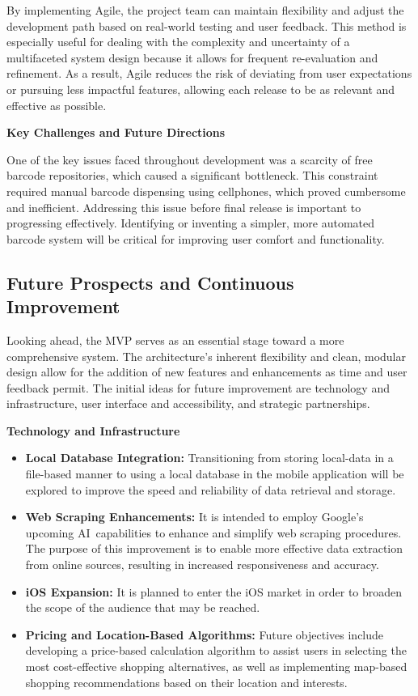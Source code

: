 \pagebreak

By implementing Agile, the project team can maintain flexibility and adjust the development path based on real-world testing and user feedback. This method is especially useful for dealing with the complexity and uncertainty of a multifaceted system design because it allows for frequent re-evaluation and refinement. As a result, Agile reduces the risk of deviating from user expectations or pursuing less impactful features, allowing each release to be as relevant and effective as possible. \cite{agile}

\noindent\textbf{Key Challenges and Future Directions}

One of the key issues faced throughout development was a scarcity of free barcode repositories, which caused a significant bottleneck. This constraint required manual barcode dispensing using cellphones, which proved cumbersome and inefficient. Addressing this issue before final release is important to progressing effectively. Identifying or inventing a simpler, more automated barcode system will be critical for improving user comfort and functionality.

\subsection{Future Prospects and Continuous Improvement}

Looking ahead, the MVP serves as an essential stage toward a more comprehensive system. The architecture's inherent flexibility and clean, modular design allow for the addition of new features and enhancements as time and user feedback permit. The initial ideas for future improvement are technology and infrastructure, user interface and accessibility, and strategic partnerships.

\noindent\textbf{Technology and Infrastructure}

\begin{itemize}
	\item \textbf{Local Database Integration:} Transitioning from storing local-data in a file-based manner to using a local database in the mobile application will be explored to improve the speed and reliability of data retrieval and storage.
	\item \textbf{Web Scraping Enhancements:} It is intended to employ Google's upcoming AI capabilities to enhance and simplify web scraping procedures. The purpose of this improvement is to enable more effective data extraction from online sources, resulting in increased responsiveness and accuracy.
	\item \textbf{iOS Expansion:} It is planned to enter the iOS market in order to broaden the scope of the audience that may be reached.
	\item \textbf{Pricing and Location-Based Algorithms:} Future objectives include developing a price-based calculation algorithm to assist users in selecting the most cost-effective shopping alternatives, as well as implementing map-based shopping recommendations based on their location and interests.
\end{itemize}

